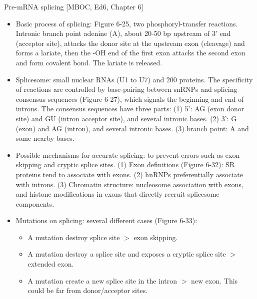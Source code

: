 \documentclass{report}
\begin{document}
Pre-mRNA splicing [MBOC, Ed6, Chapter 6]
\begin{itemize}
	\item Basic process of splicing: Figure 6-25, two phosphoryl-transfer reactions. Intronic branch point adenine (A), about 20-50 bp upstream of 3' end (acceptor site), attacks the donor site at the upstream exon (cleavage) and forms a lariate, then the -OH end of the first exon attacks the second exon and form covalent bond. The lariate is released. 
	
	\item Splicesome: small nuclear RNAs (U1 to U7) and 200 proteins. The specificity of reactions are controlled by base-pairing between snRNPs and splicing consensus sequences (Figure 6-27), which signals the beginning and end of introns. The consensus sequences have three parts: (1) 5': AG (exon donor site) and GU (intron acceptor site), and several intronic bases. (2) 3': G (exon) and AG (intron), and several intronic bases. (3) branch point: A and some nearby bases. 
	
	\item Possible mechanisms for accurate splicing: to prevent errors such as exon skipping and cryptic splice sites. (1) Exon definitions (Figure 6-32): SR proteins tend to associate with exons. (2) hnRNPs preferentially associate with introns. (3) Chromatin structure: nucleosome association with exons, and histone modifications in exons that directly recruit splicesome components.   
	
	\item Mutations on splicing: several different cases (Figure 6-33): 
	\begin{itemize}
		\item A mutation destroy splice site $>$ exon skipping. 
		\item A mutation destroy a splice site and exposes a cryptic splice site $>$ extended exon. 
		\item A mutation create a new splice site in the intron $>$ new exon. This could be far from donor/acceptor sites. 
	\end{itemize}
\end{itemize}
\end{document}
